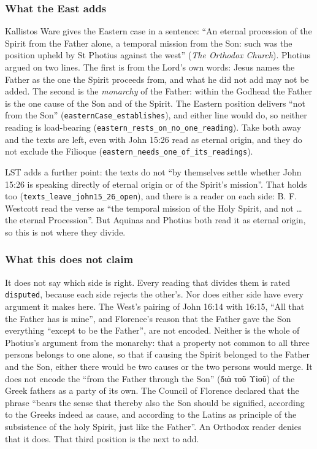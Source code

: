 \documentclass[11pt,paper=\testimonypaper,DIV=13,parskip=false]{scrartcl}
\begin{document}
\subsubsection*{What the East adds}
Kallistos Ware gives the Eastern case in a sentence: “An eternal procession of the Spirit from the Father alone, a temporal mission from the Son: such was the position upheld by St Photius against the west” (\emph{The Orthodox Church}). Photius argued on two lines. The first is from the Lord’s own words: Jesus names the Father as the one the Spirit proceeds from, and what he did not add may not be added. The second is the \emph{monarchy} of the Father: within the Godhead the Father is the one cause of the Son and of the Spirit. The Eastern position delivers “not from the Son” (\texttt{eastern\allowbreak{}Case\_\allowbreak{}establishes}), and either line would do, so neither reading is load-bearing (\texttt{eastern\_\allowbreak{}rests\_\allowbreak{}on\_\allowbreak{}no\_\allowbreak{}one\_\allowbreak{}reading}). Take both away and the texts are left, even with John 15:26 read as eternal origin, and they do not exclude the Filioque (\texttt{eastern\_\allowbreak{}needs\_\allowbreak{}one\_\allowbreak{}of\_\allowbreak{}its\_\allowbreak{}readings}).

LST adds a further point: the texts do not “by themselves settle whether John 15:26 is speaking directly of eternal origin or of the Spirit’s mission”. That holds too (\texttt{texts\_\allowbreak{}leave\_\allowbreak{}john15\_\allowbreak{}26\_\allowbreak{}open}), and there is a reader on each side: B. F. Westcott read the verse as “the temporal mission of the Holy Spirit, and not … the eternal Procession”. But Aquinas and Photius both read it as eternal origin, so this is not where they divide.

\subsubsection*{What this does not claim}
It does not say which side is right. Every reading that divides them is rated \texttt{disputed}, because each side rejects the other’s. Nor does either side have every argument it makes here. The West’s pairing of John 16:14 with 16:15, “All that the Father has is mine”, and Florence’s reason that the Father gave the Son everything “except to be the Father”, are not encoded. Neither is the whole of Photius’s argument from the monarchy: that a property not common to all three persons belongs to one alone, so that if causing the Spirit belonged to the Father and the Son, either there would be two causes or the two persons would merge. It does not encode the “from the Father through the Son” (διὰ τοῦ Υἱοῦ) of the Greek fathers as a party of its own. The Council of Florence declared that the phrase “bears the sense that thereby also the Son should be signified, according to the Greeks indeed as cause, and according to the Latins as principle of the subsistence of the holy Spirit, just like the Father”. An Orthodox reader denies that it does. That third position is the next to add.
\end{document}
